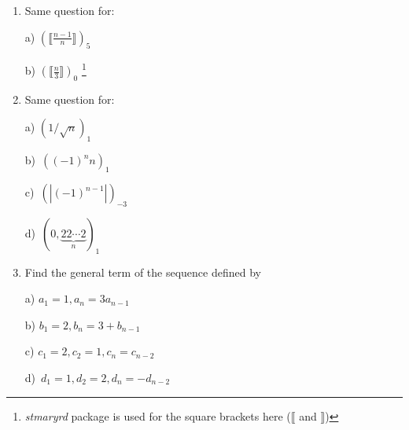 \documentclass[11pt]{amsbook}
\begin{document}
\begin{enumerate}
	\item
  Same question for:

  \begin{multicols}{2}
  	a) $(\llbracket\frac{n-1}{n}\rrbracket)_5$

  	b) $(\llbracket\frac{n}{3}\rrbracket)_0$
  	\footnote{\textit{stmaryrd} package is used for the square brackets
    here ($\llbracket$ and $\rrbracket$)}
  \end{multicols}

	\item
  Same question for:

  \begin{multicols}{4}
  	a) $(1 / \sqrt{n})_1$

  	\mbox{b) $((-1)^n n)_1$}

  	\mbox{c) $(|(-1)^{n-1}|)_{-3}$}

  	\mbox{d) $(0, \underbrace{22\cdots2}_n)_1$}
  \end{multicols}

	\item
  Find the general term of the sequence defined by

  \begin{multicols}{2}
  	a) $a_1 = 1, a_n = 3 a_{n-1}$

  	b) $b_1 = 2, b_n = 3 + b_{n-1}$
  \end{multicols}
  \begin{multicols}{2}
  	c) $c_1 = 2, c_2 = 1, c_n = c_{n-2}$

  	\mbox{d) $d_1 = 1, d_2 = 2, d_n = -d_{n-2}$}
  \end{multicols}
\end{enumerate}
\end{document}
